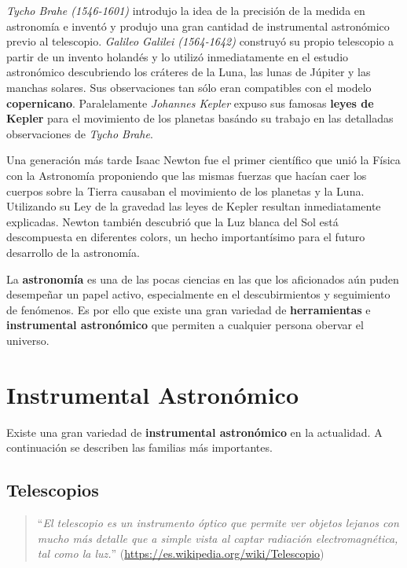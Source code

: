  \bigskip
 \textit{Tycho Brahe (1546-1601)} introdujo la idea de la precisión de la medida en astronomía e inventó y produjo una gran cantidad de instrumental astronómico previo al telescopio. \textit{Galileo Galilei (1564-1642)} construyó su propio telescopio a partir de un invento holandés y lo utilizó inmediatamente en el estudio astronómico descubriendo los cráteres de la Luna, las lunas de Júpiter y las manchas solares. Sus observaciones tan sólo eran compatibles con el modelo \textbf{copernicano}. Paralelamente \textit{Johannes Kepler} expuso sus famosas \textbf{leyes de Kepler} para el movimiento de los planetas basándo su trabajo en las detalladas observaciones de \textit{Tycho Brahe}.

\bigskip
Una generación más tarde Isaac Newton fue el primer científico que unió la Física con la Astronomía proponiendo que las mismas fuerzas que hacían caer los cuerpos sobre la Tierra causaban el movimiento de los planetas y la Luna. Utilizando su Ley de la gravedad las leyes de Kepler resultan inmediatamente explicadas. Newton también descubrió que la Luz blanca del Sol está descompuesta en diferentes colors, un hecho importantísimo para el futuro desarrollo de la astronomía.

\bigskip
La \textbf{astronomía} es una de las pocas ciencias en las que los aficionados aún puden desempeñar un papel activo, especialmente en el descubirmientos y seguimiento de fenómenos. Es por ello que existe una gran variedad de \textbf{herramientas} e \textbf{instrumental astronómico} que permiten a cualquier persona obervar el universo.

\newpage
\section{Instrumental Astronómico}

Existe una gran variedad de \textbf{instrumental astronómico} en la actualidad. A continuación se describen las familias más importantes.

\subsection{Telescopios}

\begin{quote}``\textit{El telescopio es un instrumento óptico que permite ver objetos lejanos con mucho más detalle que a simple vista al captar radiación electromagnética, tal como la luz.}''
\newline(\url{https://es.wikipedia.org/wiki/Telescopio})
\end{quote}

